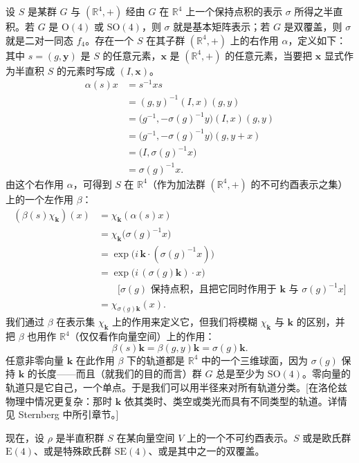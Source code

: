 设 $S$ 是某群 $G$ 与 $(\mathbb{R}^4,+)$ 经由 $G$ 在 $\mathbb{R}^4$ 上一个保持点积的表示 $\sigma$ 所得之半直积。若 $G$ 是 $\mathrm{O}(4)$ 或 $\mathrm{SO}(4)$，则 $\sigma$ 就是基本矩阵表示；若 $G$ 是双覆盖，则 $\sigma$ 就是二对一同态 $f_4$。存在一个 $S$ 在其子群 $(\mathbb{R}^4,+)$ 上的右作用 $\alpha$，定义如下：其中 $s=(g,\mathbf{y})$ 是 $S$ 的任意元素，$\mathbf{x}$ 是 $(\mathbb{R}^4,+)$ 的任意元素，当要把 $\mathbf{x}$ 显式作为半直积 $S$ 的元素时写成 $(I,\mathbf{x})$。
\begin{align*}
\alpha(s)x
&=s^{-1}xs\\
&=(g,y)^{-1}(I,x)(g,y)\\
&=\big(g^{-1},-\sigma(g)^{-1}y\big)(I,x)(g,y)\\
&=\big(g^{-1},-\sigma(g)^{-1}y\big)(g,y+x)\\
&=\big(I,\sigma(g)^{-1}x\big)\\
&=\sigma(g)^{-1}x .
\end{align*}
由这个右作用 $\alpha$，可得到 $S$ 在 $\mathbb{R}^4$（作为加法群 $(\mathbb{R}^4,+)$ 的不可约酉表示之集）上的一个左作用 $\beta$：
\begin{align*}
(\beta(s)\chi_{\mathbf{k}})(x)
&=\chi_{\mathbf{k}}(\alpha(s)x)\\
&=\chi_{\mathbf{k}}\big(\sigma(g)^{-1}x\big)\\
&=\exp\big(i\,\mathbf{k}\cdot(\sigma(g)^{-1}x)\big)\\
&=\exp\big(i\,(\sigma(g)\mathbf{k})\cdot x\big)\\
&\qquad\text{[$\sigma(g)$ 保持点积，且把它同时作用于 $\mathbf{k}$ 与 $\sigma(g)^{-1}x$]}\\
&=\chi_{\sigma(g)\mathbf{k}}(x).
\end{align*}
我们通过 $\beta$ 在表示集 $\chi_{\mathbf{k}}$ 上的作用来定义它，但我们将模糊 $\chi_{\mathbf{k}}$ 与 $\mathbf{k}$ 的区别，并把 $\beta$ 也用作 $\mathbb{R}^4$（仅仅看作向量空间）上的作用：
\[
\beta(s)\mathbf{k}=\beta(g,y)\mathbf{k}=\sigma(g)\mathbf{k}.
\]
任意非零向量 $\mathbf{k}$ 在此作用 $\beta$ 下的轨道都是 $\mathbb{R}^4$ 中的一个三维球面，因为 $\sigma(g)$ 保持 $\mathbf{k}$ 的长度——而且（就我们的目的而言）群 $G$ 总是至少为 $\mathrm{SO}(4)$。零向量的轨道只是它自己，一个单点。于是我们可以用半径来对所有轨道分类。[在洛伦兹物理中情况更复杂：那时 $\mathbf{k}$ 依其类时、类空或类光而具有不同类型的轨道。详情见 Sternberg 中所引章节。]

现在，设 $\rho$ 是半直积群 $S$ 在某向量空间 $V$ 上的一个不可约酉表示。$S$ 或是欧氏群 $\mathrm{E}(4)$、或是特殊欧氏群 $\mathrm{SE}(4)$、或是其中之一的双覆盖。

